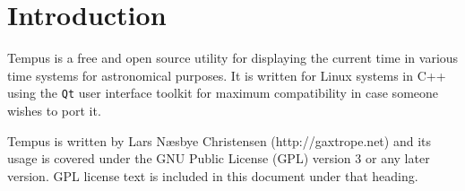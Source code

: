 \section{Introduction}
Tempus is a free and open source utility for displaying the current time in various time systems for astronomical purposes. It is written for Linux systems in C++ using the \texttt{Qt} user interface toolkit for maximum compatibility in case someone wishes to port it.

Tempus is written by Lars N{\ae}sbye Christensen (http://gaxtrope.net) and its usage is covered under the GNU Public License (GPL) version 3 or any later version. GPL license text is included in this document under that heading.

